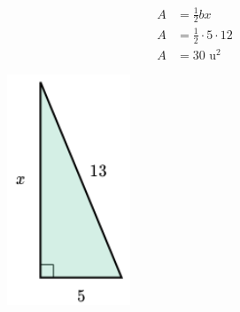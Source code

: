 \begin{solutionbox}{15cm}
\begin{minipage}{0.6\textwidth}
        \begin{align*}
            A & =\frac{1}{2}bx              \\
            A & =\frac{1}{2}\cdot 5\cdot 12 \\
            A & =30 \text{ u}^2
        \end{align*}
    \end{minipage}\hfill
    \begin{minipage}{0.35\textwidth}
        \begin{figure}[H]
            \centering
            \includegraphics[width=0.5\linewidth]{../images/area_rectangulo_03a.png}
            \caption{}
            \label{fig:area_rectangulo_03a}
        \end{figure}
    \end{minipage}

\end{solutionbox}
